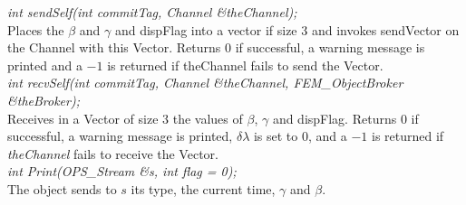 {\em int sendSelf(int commitTag, Channel \&theChannel); } \\ 
Places the $\beta$ and $\gamma$ and \p dispFlag into a vector if size 3
and invokes \p sendVector on the Channel with this Vector. Returns
$0$ if successful, a warning message is printed and a $-1$ is
returned if \p theChannel fails to send the Vector. \\ 

{\em int recvSelf(int commitTag, Channel \&theChannel, 
FEM\_ObjectBroker \&theBroker); } \\ 
Receives in a Vector of size 3 the values of $\beta$, $\gamma$ and
\p dispFlag. Returns $0$ if successful, a warning message is printed,
$\delta \lambda$ is set to $0$, and a $-1$ is returned if {\em
theChannel} fails to receive the Vector.\\

{\em int Print(OPS\_Stream \&s, int flag = 0);}\\
The object sends to $s$ its type, the current time, $\gamma$ and
$\beta$. 






